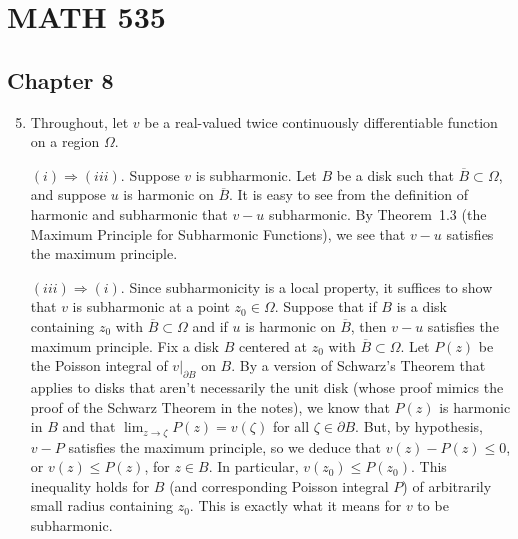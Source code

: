 \documentclass[11pt]{book}
\theoremstyle{definition}
\begin{document}
\section{MATH 535}
\subsection{Chapter 8}
\begin{enumerate}
    \setcounter{enumi}{4}
  \item Throughout, let $v$ be a real-valued twice continuously differentiable function on a region $\Omega$.

    $(i)\Rightarrow (iii)$.  Suppose $v$ is subharmonic.  Let $B$ be a disk such that $\overline B \subset \Omega$, and suppose $u$ is harmonic on $\overline B$.  It is easy to see from the definition of harmonic and subharmonic that $v-u$ subharmonic.  By Theorem~1.3 (the Maximum Principle for Subharmonic Functions), we see that $v-u$ satisfies the maximum principle.   

    $(iii) \Rightarrow (i)$.  Since subharmonicity is a local property, it suffices to show that $v$ is subharmonic at a point $z_0\in \Omega$.  Suppose that if $B$ is a disk containing $z_0$ with $\overline B \subset \Omega$ and if $u$ is harmonic on $\overline B$, then $v-u$ satisfies the maximum principle.  Fix a disk $B$ centered at $z_0$ with $\overline B \subset \Omega$.  Let $P(z)$ be the Poisson integral of $v|_{\partial B}$ on $B$.  By a version of Schwarz's Theorem that applies to disks that aren't necessarily the unit disk (whose proof mimics the proof of the Schwarz Theorem in the notes), we know that $P(z)$ is harmonic in $B$ and that $\lim_{z\rightarrow \zeta} P(z) = v(\zeta)$ for all $\zeta \in \partial B$.  But, by hypothesis, $v-P$ satisfies the maximum principle, so we deduce that $v(z) - P(z) \leq 0$, or $v(z) \leq P(z)$, for $z\in B$.  In particular, $v(z_0) \leq P(z_0)$.  This inequality holds for $B$ (and corresponding Poisson integral $P$) of arbitrarily small radius containing $z_0$.  This is exactly what it means for $v$ to be subharmonic.   


\end{enumerate}
\end{document}
